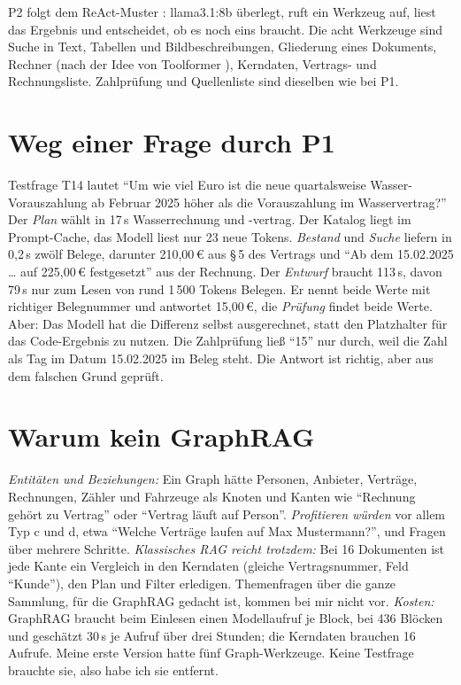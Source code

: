 P2 folgt dem ReAct-Muster \cite{yao2023}: llama3.1:8b überlegt, ruft ein Werkzeug auf, liest das Ergebnis und entscheidet, ob es noch eins braucht. Die acht Werkzeuge sind Suche in Text, Tabellen und Bildbeschreibungen, Gliederung eines Dokuments, Rechner (nach der Idee von Toolformer \cite{schick2023}), Kerndaten, Vertrags- und Rechnungsliste. Zahlprüfung und Quellenliste sind dieselben wie bei P1.

\section{Weg einer Frage durch P1}
\label{sec:weg}

Testfrage T14 lautet \enquote{Um wie viel Euro ist die neue quartalsweise Wasser-Vorauszahlung ab Februar 2025 höher als die Vorauszahlung im Wasservertrag?} Der \emph{Plan} wählt in 17\,s Wasserrechnung und -vertrag. Der Katalog liegt im Prompt-Cache, das Modell liest nur 23 neue Tokens. \emph{Bestand} und \emph{Suche} liefern in 0,2\,s zwölf Belege, darunter 210,00\,€ aus §\,5 des Vertrags und \enquote{Ab dem 15.02.2025 \dots{} auf 225,00\,€ festgesetzt} aus der Rechnung. Der \emph{Entwurf} braucht 113\,s, davon 79\,s nur zum Lesen von rund 1\,500 Tokens Belegen. Er nennt beide Werte mit richtiger Belegnummer und antwortet 15,00\,€, die \emph{Prüfung} findet beide Werte. Aber: Das Modell hat die Differenz selbst ausgerechnet, statt den Platzhalter für das Code-Ergebnis zu nutzen. Die Zahlprüfung ließ \enquote{15} nur durch, weil die Zahl als Tag im Datum 15.02.2025 im Beleg steht. Die Antwort ist richtig, aber aus dem falschen Grund geprüft.

\section{Warum kein GraphRAG}
\label{sec:graphrag}

\emph{Entitäten und Beziehungen:} Ein Graph hätte Personen, Anbieter, Verträge, Rechnungen, Zähler und Fahrzeuge als Knoten und Kanten wie \enquote{Rechnung gehört zu Vertrag} oder \enquote{Vertrag läuft auf Person}. \emph{Profitieren würden} vor allem Typ c und d, etwa \enquote{Welche Verträge laufen auf Max Mustermann?}, und Fragen über mehrere Schritte. \emph{Klassisches RAG reicht trotzdem:} Bei 16 Dokumenten ist jede Kante ein Vergleich in den Kerndaten (gleiche Vertragsnummer, Feld \enquote{Kunde}), den Plan und Filter erledigen. Themenfragen über die ganze Sammlung, für die GraphRAG gedacht ist, kommen bei mir nicht vor. \emph{Kosten:} GraphRAG braucht beim Einlesen einen Modellaufruf je Block, bei 436 Blöcken und geschätzt 30\,s je Aufruf über drei Stunden; die Kerndaten brauchen 16 Aufrufe. Meine erste Version hatte fünf Graph-Werkzeuge. Keine Testfrage brauchte sie, also habe ich sie entfernt.

